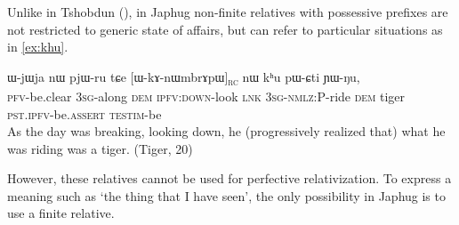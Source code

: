 \documentclass[oldfontcommands,oneside,a4paper,11pt]{article}
\newcommand{\ipa}[1]{{\phon #1}} %
\newcommand{\topic}{\textsc{dem}}
\newcommand{\rc}{\textsubscript{\textsc{rc}}}
\begin{document}
  


Unlike in Tshobdun (\citealt[10]{jacksonlin07}), in Japhug non-finite relatives with possessive prefixes are not restricted to generic state of affairs, but can refer to particular situations as in \ref{ex:khu}.


     \begin{exe}
   \ex \label{ex:khu}
   \gll  \ipa{lɤ-fsoʁ}  	\ipa{ɯ-jɯja}  	\ipa{nɯ}  	\ipa{pjɯ-ru}  	\ipa{tɕe}  	[\ipa{ɯ-kɤ-nɯmbrɤpɯ}]\rc{}  	\ipa{nɯ}  	\ipa{kʰu}  	\ipa{pɯ-ɕti}  	\ipa{ɲɯ-ŋu,}  \\
\textsc{pfv}-be.clear    \textsc{3sg}-along  \textsc{dem} \textsc{ipfv:down}-look \textsc{lnk} \textsc{3sg-nmlz:P}-ride \topic{} tiger \textsc{pst.ipfv}-be.\textsc{assert}  \textsc{testim}-be \\
\glt As the day was breaking, looking down, he (progressively realized that) what he was riding was a tiger. (Tiger, 20)
\end{exe}

However, these relatives cannot be used for perfective relativization. To express a meaning such as `the thing that I have  seen', the only possibility in Japhug is to use a finite relative.


%
%  
\end{document}
